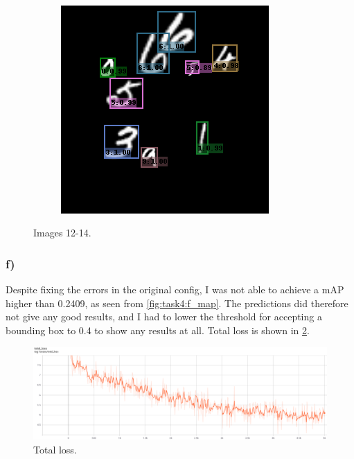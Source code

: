 \begin{figure}
\begin{subfigure}[b]{0.49\textwidth}
  \end{subfigure}
  ~
  \begin{subfigure}[b]{0.49\textwidth}
    \centering
    \includegraphics[width=\textwidth]{figures/14.png}
  \end{subfigure}
  \caption{Images 12-14.}
  \label{fig:task4:e3}
\end{figure}


\subsubsection*{f)}

Despite fixing the errors in the original config, I was not able to achieve a mAP higher than 0.2409, as seen from \cref{fig:task4:f_map}. The predictions did therefore not give any good results, and I had to lower the threshold for accepting a bounding box to 0.4 to show any results at all. Total loss is shown in \cref{fig:task4:f_loss}.

\begin{figure}[h!]
  \centering
  \includegraphics[width=\textwidth]{figures/Task4f_loss.png}
  \caption{Total loss.}
  \label{fig:task4:f_loss}
\end{figure}

